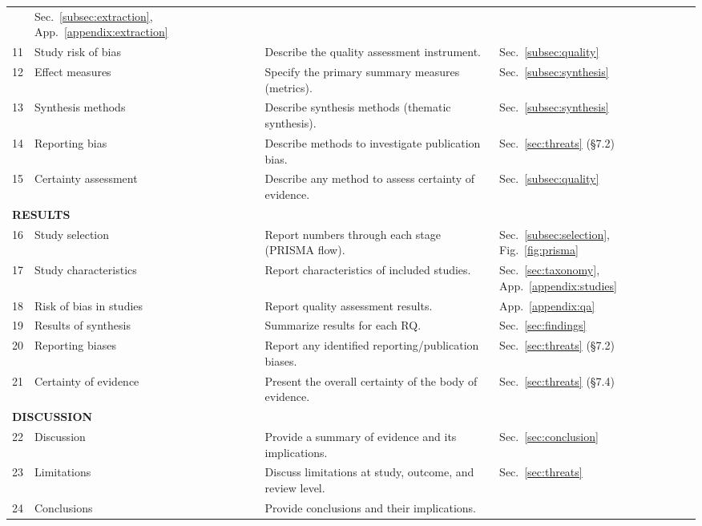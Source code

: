 \begin{longtable}{p{0.4cm}p{3.5cm}p{5.5cm}p{2.5cm}}
                     & Sec.~\ref{subsec:extraction}, App.~\ref{appendix:extraction} \\
11 & Study risk of bias      & Describe the quality assessment instrument.
                     & Sec.~\ref{subsec:quality} \\
12 & Effect measures         & Specify the primary summary measures (metrics).
                     & Sec.~\ref{subsec:synthesis} \\
13 & Synthesis methods       & Describe synthesis methods (thematic synthesis).
                     & Sec.~\ref{subsec:synthesis} \\
14 & Reporting bias          & Describe methods to investigate publication bias.
                     & Sec.~\ref{sec:threats} (\S7.2) \\
15 & Certainty assessment    & Describe any method to assess certainty of evidence.
                     & Sec.~\ref{subsec:quality} \\[3pt]
\multicolumn{4}{l}{\textbf{RESULTS}}\\
16 & Study selection         & Report numbers through each stage (PRISMA flow).
                     & Sec.~\ref{subsec:selection}, Fig.~\ref{fig:prisma} \\
17 & Study characteristics   & Report characteristics of included studies.
                     & Sec.~\ref{sec:taxonomy}, App.~\ref{appendix:studies} \\
18 & Risk of bias in studies & Report quality assessment results.
                     & App.~\ref{appendix:qa} \\
19 & Results of synthesis    & Summarize results for each RQ.
                     & Sec.~\ref{sec:findings} \\
20 & Reporting biases        & Report any identified reporting/publication biases.
                     & Sec.~\ref{sec:threats} (\S7.2) \\
21 & Certainty of evidence   & Present the overall certainty of the body of evidence.
                     & Sec.~\ref{sec:threats} (\S7.4) \\[3pt]
\multicolumn{4}{l}{\textbf{DISCUSSION}}\\
22 & Discussion              & Provide a summary of evidence and its implications.
                     & Sec.~\ref{sec:conclusion} \\
23 & Limitations             & Discuss limitations at study, outcome, and review level.
                     & Sec.~\ref{sec:threats} \\
24 & Conclusions             & Provide conclusions and their implications.

\end{longtable}
